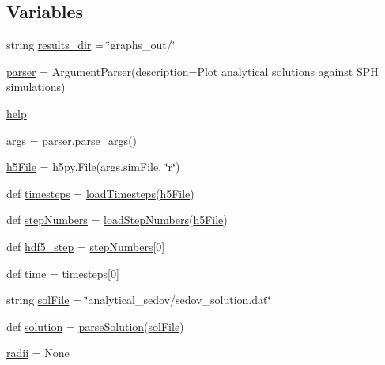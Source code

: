 \subsection*{Variables}
\begin{DoxyCompactItemize}
\item 
string \mbox{\hyperlink{namespacecompare__solutions__wash_ae83d941d7a508d3c738fccee130273a0}{results\+\_\+dir}} = \char`\"{}graphs\+\_\+out/\char`\"{}
\item 
\mbox{\hyperlink{namespacecompare__solutions__wash_afeba07d349a56775d3ad54a471ac69b3}{parser}} = Argument\+Parser(description=\textquotesingle{}Plot analytical solutions against S\+PH simulations\textquotesingle{})
\item 
\mbox{\hyperlink{namespacecompare__solutions__wash_a1fbca7d235a0148467562a83da0f7205}{help}}
\item 
\mbox{\hyperlink{namespacecompare__solutions__wash_a4d39b8cd639016493dc3983a1f639177}{args}} = parser.\+parse\+\_\+args()
\item 
\mbox{\hyperlink{namespacecompare__solutions__wash_a134c58f3c3cb96d84b6070546fd6830c}{h5\+File}} = h5py.\+File(args.\+sim\+File, \char`\"{}r\char`\"{})
\item 
def \mbox{\hyperlink{namespacecompare__solutions__wash_acd63a8b5cbad89bba3c4ca2abf9a8231}{timesteps}} = \mbox{\hyperlink{namespacecompare__solutions__wash_a45f4b24054ceb028d7ca53bcdeefef5f}{load\+Timesteps}}(\mbox{\hyperlink{namespacecompare__solutions__wash_a134c58f3c3cb96d84b6070546fd6830c}{h5\+File}})
\item 
def \mbox{\hyperlink{namespacecompare__solutions__wash_a419f9f7ba74b2aff6ac5826306d0b512}{step\+Numbers}} = \mbox{\hyperlink{namespacecompare__solutions__wash_a13dfad6bbc2ba1a437ee77253075b68a}{load\+Step\+Numbers}}(\mbox{\hyperlink{namespacecompare__solutions__wash_a134c58f3c3cb96d84b6070546fd6830c}{h5\+File}})
\item 
def \mbox{\hyperlink{namespacecompare__solutions__wash_a65f9aa74f262df7a8fe6b3ca1a4f49ea}{hdf5\+\_\+step}} = \mbox{\hyperlink{namespacecompare__solutions__wash_a419f9f7ba74b2aff6ac5826306d0b512}{step\+Numbers}}\mbox{[}0\mbox{]}
\item 
def \mbox{\hyperlink{namespacecompare__solutions__wash_addfb10b27eaa62790f49a45459f6dbc5}{time}} = \mbox{\hyperlink{namespacecompare__solutions__wash_acd63a8b5cbad89bba3c4ca2abf9a8231}{timesteps}}\mbox{[}0\mbox{]}
\item 
string \mbox{\hyperlink{namespacecompare__solutions__wash_af109703ea04251678337f3fc650a2d7f}{sol\+File}} = \char`\"{}analytical\+\_\+sedov/sedov\+\_\+solution.\+dat\char`\"{}
\item 
def \mbox{\hyperlink{namespacecompare__solutions__wash_a12d25e9192cbe8fd9232d4e9f3c60c21}{solution}} = \mbox{\hyperlink{namespacecompare__solutions__wash_ae62cbff3d508ce20459a98127dfb1ae5}{parse\+Solution}}(\mbox{\hyperlink{namespacecompare__solutions__wash_af109703ea04251678337f3fc650a2d7f}{sol\+File}})
\item 
\mbox{\hyperlink{namespacecompare__solutions__wash_afbb849fe1473042de242bb0af37ecef2}{radii}} = None
\end{DoxyCompactItemize}


